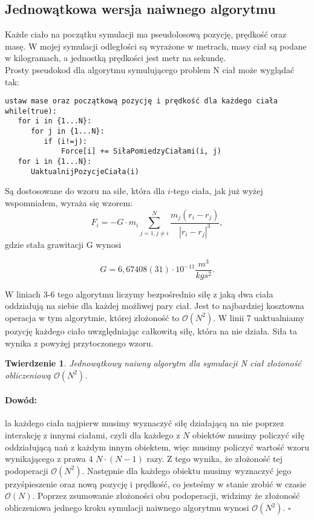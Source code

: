 \documentclass[14pt,twoside,a4paper]{article}
\newenvironment{myproof}[2] {\paragraph{Dowód:}}{\hfill$\square$}
\newcommand\tab[1][1cm]{\hspace*{#1}}
\begin{document}
\subsection{\Large Jednowątkowa wersja naiwnego algorytmu}

Każde ciało na początku symulacji ma pseudolosową pozycję, prędkość oraz masę. W mojej symulacji odległości są wyrażone w metrach, masy ciał są podane w kilogramach, a jednostką prędkości jest metr na sekundę. \\
Prosty pseudokod dla algorytmu symulującego problem N ciał może wyglądać tak:\\
\bigskip


\begin{lstlisting}[frame=single, framerule=2pt, caption=Pseudokod naiwnego algorytmu]
ustaw mase oraz początkową pozycję i prędkość dla każdego ciała
while(true):
   for i in {1...N}:
   	  for j in {1...N}:
   	   	 if (i!=j):
   	   		 Force[i] += SiłaPomiedzyCiałami(i, j) 
   for i in {1...N}:
   	  UaktualnijPozycjeCiała(i)
\end{lstlisting}

\bigskip
Są dostosowane do wzoru na siłe, która dla $i$-tego ciała, jak już wyżej wspomniałem, wyraża się wzorem:\\
$$F_i = -G\cdot m_i \sum_{j=1, j\neq i}^N \frac{m_j(r_i - r_j)}{|r_i - r_j|^3},$$ 
gdzie stała grawitacji G wynosi
\begin{center}
$$G = 6,67408(31)\cdot 10^{-11} \frac{m^{3}}{kg s^2}.$$
\end{center}

W liniach 3-6 tego algorytmu liczymy bezpośrednio siłę z jaką dwa ciała oddziałują na siebie dla każdej możliwej pary ciał. Jest to najbardziej kosztowna operacja w tym algorytmie, której złożoność to $\mathcal{O}(N^{2})$. W linii 7 uaktualniamy pozycję każdego ciało uwzględniając całkowitą siłę, która na nie działa. Siła ta wynika z powyżęj przytoczonego wzoru. 
\bigskip
\newtheorem{twr}{Twierdzenie}
\begin{twr}
Jednowątkowy naiwny algorytm dla symulacji N ciał złożoność obliczeniową $\mathcal{O}(N^{2})$.
\end{twr}

\begin{myproof}

\tab Dla każdego ciała najpierw musimy wyznaczyć siłę działającą na nie poprzez interakcję z innymi ciałami, czyli dla każdego z $N$ obiektów musimy policzyć siłę oddziałującą nań z każdym innym obiektem, więc musimy policzyć wartość wzoru wynikającego z prawa $4$ $N\cdot (N-1)$ razy. Z tego wynika, że złożoność tej podoperacji $\mathcal{O}(N^{2})$. 
Następnie dla każdego obiektu musimy wyznaczyć jego przyśpieszenie oraz nową pozycję i prędkość, co jesteśmy w stanie zrobić w czasie $\mathcal{O}(N)$.
Poprzez zsumowanie złożoności obu podoperacji, widzimy że złożoność obliczeniowa jednego kroku symulacji naiwnego algorytmu wynosi $\mathcal{O}(N^{2})$.
\end{myproof}
\end{document}
